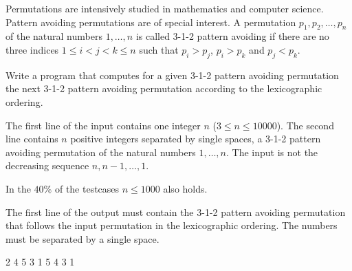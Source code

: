 





Permutations are intensively studied in mathematics and computer science. Pattern avoiding permutations are of special interest. A permutation $p_1,p_2, \ldots, p_n$ of the natural numbers $1,\ldots, n$ is called 3-1-2 pattern avoiding if there are no three indices $1\leq i<j<k \leq n$ such that $p_i>p_j$,  $p_i>p_k$ and $p_j<p_k$.

Write a program that computes for a given 3-1-2 pattern avoiding permutation the next
3-1-2 pattern avoiding permutation according to the lexicographic ordering.

The first line of the input contains one integer $n$ ($3 \leq n \leq 10000$). The second line contains $n$ positive integers separated by single spaces, a 3-1-2 pattern avoiding permutation of the natural numbers $1, \ldots, n$. The input is not the decreasing sequence $n,n-1,\ldots ,1$.

In the $40\%$ of the testcases  $n \leq 1000$ also holds.

The first line of the output must contain the 3-1-2 pattern avoiding permutation that follows the input permutation in the lexicographic ordering. The numbers must be separated by a single space.


2 4 5 3 1
 5 4 3 1
\sampleCOMMENT

\sampleEND
\bigskip



